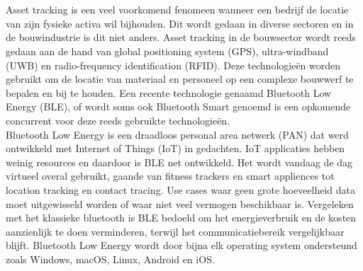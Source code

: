 
\chapter{}%
\label{ch:inleiding}

%

Asset tracking is een veel voorkomend fenomeen wanneer een bedrijf de locatie van zijn fysieke activa wil bijhouden. Dit wordt gedaan in diverse sectoren en in de bouwindustrie is dit niet anders. Asset tracking in de bouwsector wordt reeds gedaan aan de hand van global positioning system (GPS), ultra-windband (UWB) en radio-frequency identification (RFID). Deze technologieën worden gebruikt om de locatie van materiaal en personeel op een complexe bouwwerf te bepalen en bij te houden. Een recente technologie genaamd Bluetooth Low Energy (BLE), of wordt soms ook Bluetooth Smart genoemd is een opkomende concurrent voor deze reeds gebruikte technologieën. \\

Bluetooth Low Energy is een draadloos personal area netwerk (PAN) dat werd ontwikkeld met Internet of Things (IoT) in gedachten. IoT applicaties hebben weinig resources en daardoor is BLE net ontwikkeld. Het wordt vandaag de dag virtueel overal gebruikt, gaande van fitness trackers en smart appliences tot location tracking en contact tracing. Use cases waar geen grote hoeveelheid data moet uitgewisseld worden of waar niet veel vermogen beschikbaar is. Vergeleken met het klassieke bluetooth is BLE bedoeld om het energieverbruik en de kosten aanzienlijk te doen verminderen, terwijl het communicatiebereik vergelijkbaar blijft. Bluetooth Low Energy wordt door bijna elk operating system ondersteund zoals Windows, macOS, Linux,  Android en iOS.

